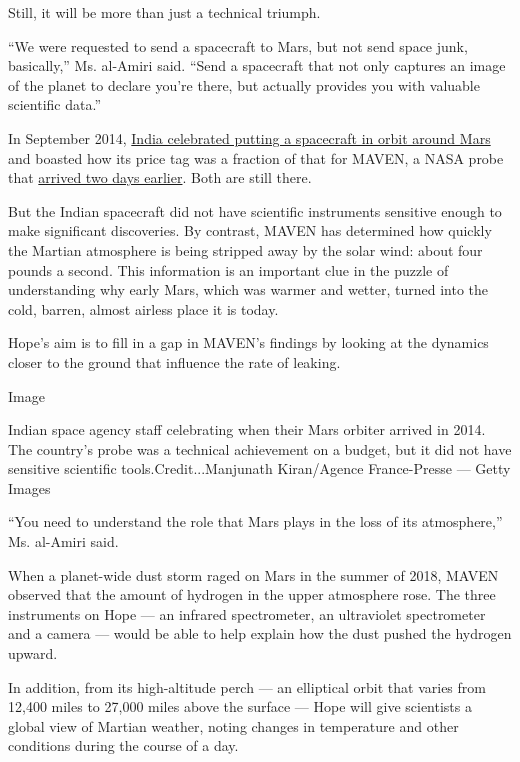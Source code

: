 Still, it will be more than just a technical triumph.

``We were requested to send a spacecraft to Mars, but not send space
junk, basically,'' Ms. al-Amiri said. ``Send a spacecraft that not only
captures an image of the planet to declare you're there, but actually
provides you with valuable scientific data.''

In September 2014,
\href{https://www.nytimes3xbfgragh.onion/2014/09/25/world/asia/on-a-shoestring-india-sends-orbiter-to-mars.html}{India
celebrated putting a spacecraft in orbit around Mars} and boasted how
its price tag was a fraction of that for MAVEN, a NASA probe that
\href{https://www.nytimes3xbfgragh.onion/2014/09/22/science/space/nasa-craft-mars.html}{arrived
two days earlier}. Both are still there.

But the Indian spacecraft did not have scientific instruments sensitive
enough to make significant discoveries. By contrast, MAVEN has
determined how quickly the Martian atmosphere is being stripped away by
the solar wind: about four pounds a second. This information is an
important clue in the puzzle of understanding why early Mars, which was
warmer and wetter, turned into the cold, barren, almost airless place it
is today.

Hope's aim is to fill in a gap in MAVEN's findings by looking at the
dynamics closer to the ground that influence the rate of leaking.

Image

Indian space agency staff celebrating when their Mars orbiter arrived in
2014. The country's probe was a technical achievement on a budget, but
it did not have sensitive scientific tools.Credit...Manjunath
Kiran/Agence France-Presse --- Getty Images

``You need to understand the role that Mars plays in the loss of its
atmosphere,'' Ms. al-Amiri said.

When a planet-wide dust storm raged on Mars in the summer of 2018, MAVEN
observed that the amount of hydrogen in the upper atmosphere rose. The
three instruments on Hope --- an infrared spectrometer, an ultraviolet
spectrometer and a camera --- would be able to help explain how the dust
pushed the hydrogen upward.

In addition, from its high-altitude perch --- an elliptical orbit that
varies from 12,400 miles to 27,000 miles above the surface --- Hope will
give scientists a global view of Martian weather, noting changes in
temperature and other conditions during the course of a day.

